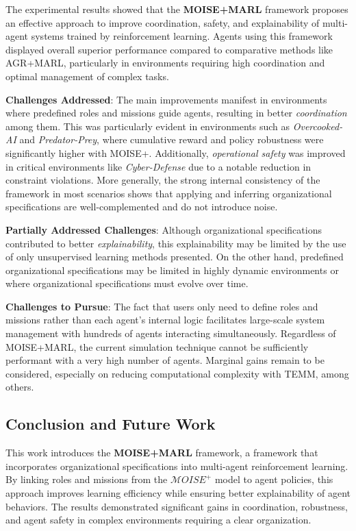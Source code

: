\documentclass[sigconf,anonymous]{aamas}
\begin{document}
The experimental results showed that the \textbf{MOISE+MARL} framework proposes an effective approach to improve coordination, safety, and explainability of multi-agent systems trained by reinforcement learning. Agents using this framework displayed overall superior performance compared to comparative methods like AGR+MARL, particularly in environments requiring high coordination and optimal management of complex tasks.

\textbf{Challenges Addressed}: The main improvements manifest in environments where predefined roles and missions guide agents, resulting in better \textit{coordination} among them. This was particularly evident in environments such as \textit{Overcooked-AI} and \textit{Predator-Prey}, where cumulative reward and policy robustness were significantly higher with MOISE+. Additionally, \textit{operational safety} was improved in critical environments like \textit{Cyber-Defense} due to a notable reduction in constraint violations. More generally, the strong internal consistency of the framework in most scenarios shows that applying and inferring organizational specifications are well-complemented and do not introduce noise.

\textbf{Partially Addressed Challenges}: Although organizational specifications contributed to better \textit{explainability}, this explainability may be limited by the use of only unsupervised learning methods presented. On the other hand, predefined organizational specifications may be limited in highly dynamic environments or where organizational specifications must evolve over time.

\textbf{Challenges to Pursue}: The fact that users only need to define roles and missions rather than each agent's internal logic facilitates large-scale system management with hundreds of agents interacting simultaneously. Regardless of MOISE+MARL, the current simulation technique cannot be sufficiently performant with a very high number of agents. Marginal gains remain to be considered, especially on reducing computational complexity with TEMM, among others.

\subsection{Conclusion and Future Work}

This work introduces the \textbf{MOISE+MARL} framework, a framework that incorporates organizational specifications into multi-agent reinforcement learning. By linking roles and missions from the $\mathcal{M}OISE^+$ model to agent policies, this approach improves learning efficiency while ensuring better explainability of agent behaviors. The results demonstrated significant gains in coordination, robustness, and agent safety in complex environments requiring a clear organization.
\end{document}
